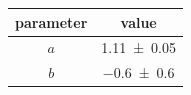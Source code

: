 \begin{tabular}{cc}
\toprule
parameter&value \\
\midrule
$a$ & \num{1.11+-0.05} \\
$b$ & \num{-0.6+-0.6} \\
\bottomrule
\end{tabular} 
